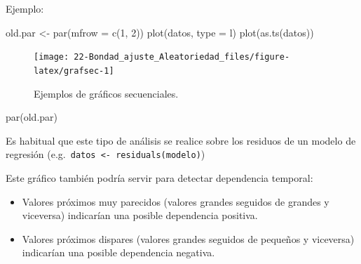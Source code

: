 \documentclass[
]{book}
\newenvironment{Shaded}{\begin{snugshade}}{\end{snugshade}}
\newcommand{\AttributeTok}[1]{\textcolor[rgb]{0.77,0.63,0.00}{#1}}
\newcommand{\DecValTok}[1]{\textcolor[rgb]{0.00,0.00,0.81}{#1}}
\newcommand{\FunctionTok}[1]{\textcolor[rgb]{0.00,0.00,0.00}{#1}}
\newcommand{\NormalTok}[1]{#1}
\newcommand{\OtherTok}[1]{\textcolor[rgb]{0.56,0.35,0.01}{#1}}
\newcommand{\StringTok}[1]{\textcolor[rgb]{0.31,0.60,0.02}{#1}}
\theoremstyle{break}
\theoremstyle{nonumberplain}
\begin{document}
Ejemplo:

\begin{Shaded}
\begin{Highlighting}[]
\NormalTok{old.par }\OtherTok{\textless{}{-}} \FunctionTok{par}\NormalTok{(}\AttributeTok{mfrow =} \FunctionTok{c}\NormalTok{(}\DecValTok{1}\NormalTok{, }\DecValTok{2}\NormalTok{))}
\FunctionTok{plot}\NormalTok{(datos, }\AttributeTok{type =} \StringTok{\textquotesingle{}l\textquotesingle{}}\NormalTok{)}
\FunctionTok{plot}\NormalTok{(}\FunctionTok{as.ts}\NormalTok{(datos))}
\end{Highlighting}
\end{Shaded}

\begin{figure}[!htb]

{\centering \texttt{[image: 22-Bondad\_ajuste\_Aleatoriedad\_files/figure-latex/grafsec-1]} 

}

\caption{Ejemplos de gráficos secuenciales.}\label{fig:grafsec}
\end{figure}

\begin{Shaded}
\begin{Highlighting}[]
\FunctionTok{par}\NormalTok{(old.par)}
\end{Highlighting}
\end{Shaded}

Es habitual que este tipo de análisis se realice sobre los residuos
de un modelo de regresión (e.g.~\texttt{datos\ \textless{}-\ residuals(modelo)})

Este gráfico también podría servir para detectar dependencia temporal:

\begin{itemize}
\item
  Valores próximos muy parecidos (valores grandes seguidos de grandes
  y viceversa) indicarían una posible dependencia positiva.
\item
  Valores próximos dispares (valores grandes seguidos de pequeños
  y viceversa) indicarían una posible dependencia negativa.
\end{itemize}
\end{document}
